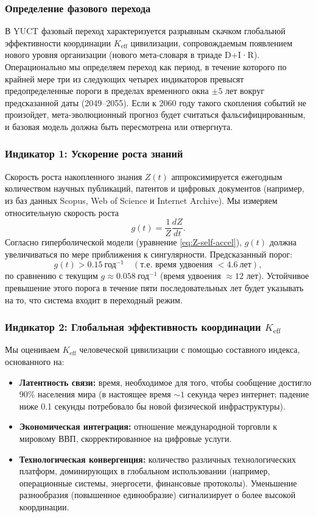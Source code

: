 \documentclass[12pt,a4paper]{article}
\theoremstyle{remark}
\begin{document}
	\subsubsection{Определение фазового перехода}
	
	В YUCT фазовый переход характеризуется разрывным скачком глобальной эффективности координации $K_{\text{eff}}$ цивилизации, сопровождаемым появлением нового уровня организации (нового мета-словаря в триаде D+I·R). Операционально мы определяем переход как период, в течение которого по крайней мере три из следующих четырех индикаторов превысят предопределенные пороги в пределах временного окна $\pm 5$ лет вокруг предсказанной даты (2049–2055). Если к 2060 году такого скопления событий не произойдет, мета-эволюционный прогноз будет считаться фальсифицированным, и базовая модель должна быть пересмотрена или отвергнута.
	
	\subsubsection{Индикатор 1: Ускорение роста знаний}
	
	Скорость роста накопленного знания $Z(t)$ аппроксимируется ежегодным количеством научных публикаций, патентов и цифровых документов (например, из баз данных Scopus, Web of Science и Internet Archive). Мы измеряем относительную скорость роста
	\[
	g(t) = \frac{1}{Z}\frac{dZ}{dt}.
	\]
	Согласно гиперболической модели (уравнение \ref{eq:Z-self-accel}), $g(t)$ должна увеличиваться по мере приближения к сингулярности. Предсказанный порог:
	\[
	g(t) > 0.15\ \text{год}^{-1} \quad (\text{т.е. время удвоения } < 4.6\ \text{лет}),
	\]
	по сравнению с текущим $g\approx 0.058\ \text{год}^{-1}$ (время удвоения $\approx 12$ лет). Устойчивое превышение этого порога в течение пяти последовательных лет будет указывать на то, что система входит в переходный режим.
	
	\subsubsection{Индикатор 2: Глобальная эффективность координации $K_{\text{eff}}$}
	
	Мы оцениваем $K_{\text{eff}}$ человеческой цивилизации с помощью составного индекса, основанного на:
	
	\begin{itemize}
		\item \textbf{Латентность связи:} время, необходимое для того, чтобы сообщение достигло 90\% населения мира (в настоящее время $\sim 1$ секунда через интернет; падение ниже 0.1 секунды потребовало бы новой физической инфраструктуры).
		\item \textbf{Экономическая интеграция:} отношение международной торговли к мировому ВВП, скорректированное на цифровые услуги.
		\item \textbf{Технологическая конвергенция:} количество различных технологических платформ, доминирующих в глобальном использовании (например, операционные системы, энергосети, финансовые протоколы). Уменьшение разнообразия (повышенное единообразие) сигнализирует о более высокой координации.
	\end{itemize}
	
\end{document}
